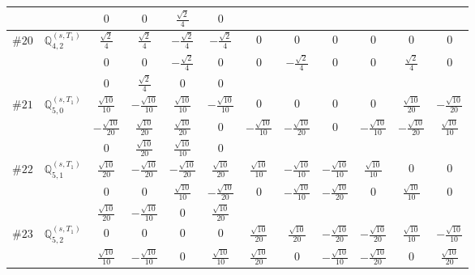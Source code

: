 \documentclass[fleqn,9pt,landscape]{jsarticle}
\begin{document}
\begin{center}
\begin{longtable}{lcccccccccc}
& $ 0 $ & $ 0 $ & $ \frac{\sqrt{2}}{4} $ & $ 0 $ & $  $ & $  $ & $  $ & $  $ & $  $ & $  $ \\ \hline
$ \#20\quad \mathbb{Q}_{4,2}^{(s,T_{1})} $ & $ \frac{\sqrt{2}}{4} $ & $ \frac{\sqrt{2}}{4} $ & $ - \frac{\sqrt{2}}{4} $ & $ - \frac{\sqrt{2}}{4} $ & $ 0 $ & $ 0 $ & $ 0 $ & $ 0 $ & $ 0 $ & $ 0 $ \\
& $ 0 $ & $ 0 $ & $ - \frac{\sqrt{2}}{4} $ & $ 0 $ & $ 0 $ & $ - \frac{\sqrt{2}}{4} $ & $ 0 $ & $ 0 $ & $ \frac{\sqrt{2}}{4} $ & $ 0 $ \\
& $ 0 $ & $ \frac{\sqrt{2}}{4} $ & $ 0 $ & $ 0 $ & $  $ & $  $ & $  $ & $  $ & $  $ & $  $ \\ \hline
$ \#21\quad \mathbb{Q}_{5,0}^{(s,T_{1})} $ & $ \frac{\sqrt{10}}{10} $ & $ - \frac{\sqrt{10}}{10} $ & $ \frac{\sqrt{10}}{10} $ & $ - \frac{\sqrt{10}}{10} $ & $ 0 $ & $ 0 $ & $ 0 $ & $ 0 $ & $ \frac{\sqrt{10}}{20} $ & $ - \frac{\sqrt{10}}{20} $ \\
& $ - \frac{\sqrt{10}}{20} $ & $ \frac{\sqrt{10}}{20} $ & $ \frac{\sqrt{10}}{20} $ & $ 0 $ & $ - \frac{\sqrt{10}}{10} $ & $ - \frac{\sqrt{10}}{20} $ & $ 0 $ & $ - \frac{\sqrt{10}}{10} $ & $ - \frac{\sqrt{10}}{20} $ & $ \frac{\sqrt{10}}{10} $ \\
& $ 0 $ & $ \frac{\sqrt{10}}{20} $ & $ \frac{\sqrt{10}}{10} $ & $ 0 $ & $  $ & $  $ & $  $ & $  $ & $  $ & $  $ \\ \hline
$ \#22\quad \mathbb{Q}_{5,1}^{(s,T_{1})} $ & $ \frac{\sqrt{10}}{20} $ & $ - \frac{\sqrt{10}}{20} $ & $ - \frac{\sqrt{10}}{20} $ & $ \frac{\sqrt{10}}{20} $ & $ \frac{\sqrt{10}}{10} $ & $ - \frac{\sqrt{10}}{10} $ & $ - \frac{\sqrt{10}}{10} $ & $ \frac{\sqrt{10}}{10} $ & $ 0 $ & $ 0 $ \\
& $ 0 $ & $ 0 $ & $ \frac{\sqrt{10}}{10} $ & $ - \frac{\sqrt{10}}{20} $ & $ 0 $ & $ - \frac{\sqrt{10}}{10} $ & $ - \frac{\sqrt{10}}{20} $ & $ 0 $ & $ \frac{\sqrt{10}}{10} $ & $ 0 $ \\
& $ \frac{\sqrt{10}}{20} $ & $ - \frac{\sqrt{10}}{10} $ & $ 0 $ & $ \frac{\sqrt{10}}{20} $ & $  $ & $  $ & $  $ & $  $ & $  $ & $  $ \\ \hline
$ \#23\quad \mathbb{Q}_{5,2}^{(s,T_{1})} $ & $ 0 $ & $ 0 $ & $ 0 $ & $ 0 $ & $ \frac{\sqrt{10}}{20} $ & $ \frac{\sqrt{10}}{20} $ & $ - \frac{\sqrt{10}}{20} $ & $ - \frac{\sqrt{10}}{20} $ & $ \frac{\sqrt{10}}{10} $ & $ - \frac{\sqrt{10}}{10} $ \\
& $ \frac{\sqrt{10}}{10} $ & $ - \frac{\sqrt{10}}{10} $ & $ 0 $ & $ \frac{\sqrt{10}}{10} $ & $ \frac{\sqrt{10}}{20} $ & $ 0 $ & $ - \frac{\sqrt{10}}{10} $ & $ - \frac{\sqrt{10}}{20} $ & $ 0 $ & $ \frac{\sqrt{10}}{20} $ \\

\end{longtable}
\end{center}
\end{document}
